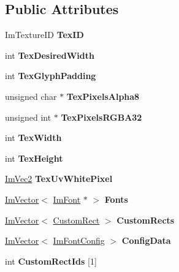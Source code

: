 \subsection*{Public Attributes}
\begin{DoxyCompactItemize}
\item 
\mbox{\label{struct_im_font_atlas_a1d7be9a6190c75706f80bda16c87f28e}} 
Im\+Texture\+ID {\bfseries Tex\+ID}
\item 
\mbox{\label{struct_im_font_atlas_aa1d62d7da5633f894dbe881547e9de7c}} 
int {\bfseries Tex\+Desired\+Width}
\item 
\mbox{\label{struct_im_font_atlas_a32034b2aac4616d8c27ee666a1fd1b62}} 
int {\bfseries Tex\+Glyph\+Padding}
\item 
\mbox{\label{struct_im_font_atlas_a443ea9e7c4cf85ee791ffe891280eff3}} 
unsigned char $\ast$ {\bfseries Tex\+Pixels\+Alpha8}
\item 
\mbox{\label{struct_im_font_atlas_a41163489a5b8060f405c56e22590cba5}} 
unsigned int $\ast$ {\bfseries Tex\+Pixels\+R\+G\+B\+A32}
\item 
\mbox{\label{struct_im_font_atlas_a2d0662502433e7a87b3aa4681ba17aa3}} 
int {\bfseries Tex\+Width}
\item 
\mbox{\label{struct_im_font_atlas_a5ef74d37ec01d9e8aac5c57433296ce3}} 
int {\bfseries Tex\+Height}
\item 
\mbox{\label{struct_im_font_atlas_af1d05221e9a1607d7f625df92a4f9b7e}} 
\hyperlink{struct_im_vec2}{Im\+Vec2} {\bfseries Tex\+Uv\+White\+Pixel}
\item 
\mbox{\label{struct_im_font_atlas_a0198aeb17ef8bb810ccc8db103b93b1f}} 
\hyperlink{class_im_vector}{Im\+Vector}$<$ \hyperlink{struct_im_font}{Im\+Font} $\ast$ $>$ {\bfseries Fonts}
\item 
\mbox{\label{struct_im_font_atlas_a6289931d958f734fdc2ac1fadec99577}} 
\hyperlink{class_im_vector}{Im\+Vector}$<$ \hyperlink{struct_im_font_atlas_1_1_custom_rect}{Custom\+Rect} $>$ {\bfseries Custom\+Rects}
\item 
\mbox{\label{struct_im_font_atlas_afa4f7459807763d032fe2d0022fc0823}} 
\hyperlink{class_im_vector}{Im\+Vector}$<$ \hyperlink{struct_im_font_config}{Im\+Font\+Config} $>$ {\bfseries Config\+Data}
\item 
\mbox{\label{struct_im_font_atlas_a608ad12c2ccf1eed97b63454e52ccbe8}} 
int {\bfseries Custom\+Rect\+Ids} \mbox{[}1\mbox{]}
\end{DoxyCompactItemize}


